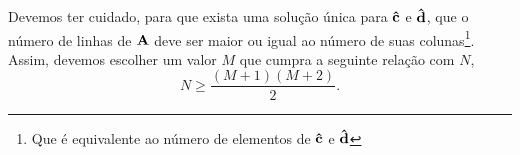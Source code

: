 \begin{theorem}
Devemos ter cuidado, para que exista uma solução única para $\VECTOR{\hat{c}}$ e $\VECTOR{\hat{d}}$,
que o número de linhas de $\MATRIX{A}$ deve ser maior ou igual ao número de suas colunas\footnote{ Que
é equivalente ao número de elementos de $\VECTOR{\hat{c}}$ e $\VECTOR{\hat{d}}$}.
Assim, devemos escolher um valor $M$ que cumpra a seguinte relação com $N$,
\begin{equation}\label{eq:mapeamento:5}
N\geq \frac{(M+1)(M+2)}{2}.
\end{equation}
\end{theorem}


